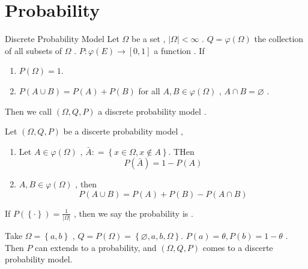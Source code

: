 \documentclass[../main.tex]{subfiles}
\begin{document}
\chapter{Probability}

\begin{definition}{Discrete Probability Model}{}
    Let \(   \Omega   \) be a set , \(  \left|  \Omega  \right|< \infty   \) .  \(  Q=  \varphi \left(  \Omega  \right)   \) the collection of all subsets of \(   \Omega   \) .  \(  P:  \varphi \left( E \right)\to \left[ 0,1 \right]    \)       a function . If
    \begin{enumerate}
        \item \(  P\left(  \Omega  \right)= 1   \).
        \item  \(  P\left( A\cup B \right)= P\left( A \right)+ P\left( B \right)     \) for all \(  A,B \in  \varphi \left(  \Omega  \right)   \) , \(  A\cap B= \varnothing  \) .     
    \end{enumerate}
    Then we call \(  \left(  \Omega ,Q,P \right)   \) a  discrete probability model . 
\end{definition}


\begin{proposition}{}{}
    Let \(  \left(  \Omega ,Q,P \right)   \) be a discerte probability model , 
    \begin{enumerate}
        \item Let \(  A \in  \varphi \left(  \Omega  \right)    \) ,  \(  \bar{A}: = \left\{ x \in  \Omega ,x \not\in A \right\}  \). THen \[
        P\left( \bar{A} \right)= 1-P\left( A \right)  
        \]
        \item \(  A,B \in  \varphi \left(  \Omega  \right)   \) , then \[
        P\left( A\cup B \right)= P\left( A \right)+ P\left( B \right)-P\left( A\cap B \right)    
        \]   
    \end{enumerate}
     
\end{proposition}

\begin{remark}
    If \(  P\left( \left\{ \cdot  \right\} \right)=  \frac{1 }{\left|  \Omega  \right|  }    \) , then we say the probability is  . 
\end{remark}

\begin{example}{}{}
    Take \(   \Omega   = \left\{ a,b \right\}\)  , \( Q=  P\left(  \Omega  \right)= \left\{ \varnothing, a,b,  \Omega  \right\}   \). \(  P\left( a \right)=  \theta , P\left( b \right)= 1- \theta     \) .  Then \(  P  \) can extends to a probability, and \(  \left(  \Omega ,Q,P  \right)   \) comes to a discerte probability model.     
\end{example}
\end{document}
